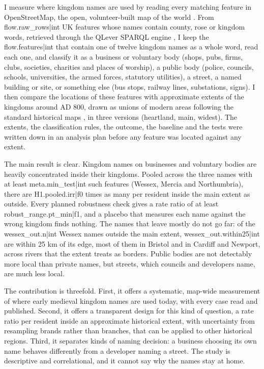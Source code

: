 \documentclass[11pt,a4paper]{article}
\begin{document}
I measure where kingdom names are used by reading every matching feature in OpenStreetMap, the open, volunteer-built map of the world \citep{haklay2008}. From {{flow.raw_rows|int}} UK features whose names contain county, rose or kingdom words, retrieved through the QLever SPARQL engine \citep{bast2017,bast2021}, I keep the {{flow.features|int}} that contain one of twelve kingdom names as a whole word, read each one, and classify it as a business or voluntary body (shops, pubs, firms, clubs, societies, charities and places of worship), a public body (police, councils, schools, universities, the armed forces, statutory utilities), a street, a named building or site, or something else (bus stops, railway lines, substations, signs). I then compare the locations of these features with approximate extents of the kingdoms around AD 800, drawn as unions of modern areas following the standard historical maps \citep{hill1981,yorke1990}, in three versions (heartland, main, widest). The extents, the classification rules, the outcome, the baseline and the tests were written down in an analysis plan before any feature was located against any extent.

The main result is clear. Kingdom names on businesses and voluntary bodies are heavily concentrated inside their kingdoms. Pooled across the three names with at least {{meta.min_test|int}} such features (Wessex, Mercia and Northumbria), there are {{H1.pooled.irr|f0}} times as many per resident inside the main extent as outside. Every planned robustness check gives a rate ratio of at least {{robust_range.pt_min|f1}}, and a placebo that measures each name against the wrong kingdom finds nothing. The names that leave mostly do not go far: of the {{wessex_out.n|int}} Wessex names outside the main extent, {{wessex_out.within25|int}} are within 25 km of its edge, most of them in Bristol and in Cardiff and Newport, across rivers that the extent treats as borders. Public bodies are not detectably more local than private names, but streets, which councils and developers name, are much less local.

The contribution is threefold. First, it offers a systematic, map-wide measurement of where early medieval kingdom names are used today, with every case read and published. Second, it offers a transparent design for this kind of question, a rate ratio per resident inside an approximate historical extent, with uncertainty from resampling brands rather than branches, that can be applied to other historical regions. Third, it separates kinds of naming decision: a business choosing its own name behaves differently from a developer naming a street. The study is descriptive and correlational, and it cannot say why the names stay at home.
\end{document}
